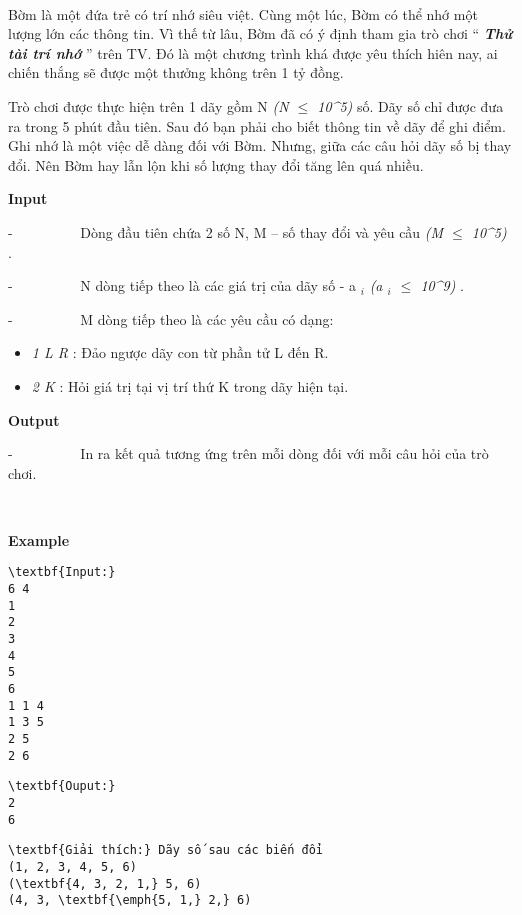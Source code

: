 

 

Bờm là một đứa trẻ có trí nhớ siêu việt. Cùng một lúc, Bờm có thể nhớ một lượng lớn các thông tin. Vì thế từ lâu, Bờm đã có ý định tham gia trò chơi “ \emph{\textbf{ Thử tài trí nhớ }} ” trên TV. Đó là một chương trình khá được yêu thích hiên nay, ai chiến thắng sẽ được một thưởng không trên 1 tỷ đồng.

Trò chơi được thực hiện trên 1 dãy gồm N \emph{ (N $\le$ 10\textasciicircum5) } số. Dãy số chỉ được đưa ra trong 5 phút đầu tiên. Sau đó bạn phải cho biết thông tin về dãy để ghi điểm. Ghi nhớ là một việc dễ dàng đối với Bờm. Nhưng, giữa các câu hỏi dãy số bị thay đổi. Nên Bờm hay lẫn lộn khi số lượng thay đổi tăng lên quá nhiều.

\textbf{Input }

-          Dòng đầu tiên chứa 2 số N, M – số thay đổi và yêu cầu \emph{ (M  $\le$  10\textasciicircum5) } .

-          N dòng tiếp theo là các giá trị của dãy số - a $_ i $\emph{ (a $_ i $  $\le$  10\textasciicircum9) } .

-          M dòng tiếp theo là các yêu cầu có dạng:
\begin{itemize}
	\item \emph{1 L R } : Đảo ngược dãy con từ phần tử L đến R.
	\item \emph{2 K } : Hỏi giá trị tại vị trí thứ K trong dãy hiện tại.
\end{itemize}

\textbf{Output }

-          In ra kết quả tương ứng trên mỗi dòng đối với mỗi câu hỏi của trò chơi.

 

\textbf{Example }
\begin{verbatim}
\textbf{Input:}
6 4
1
2
3
4
5
6
1 1 4
1 3 5
2 5
2 6
\end{verbatim}
\begin{verbatim}
\textbf{Ouput:}
2
6\end{verbatim}
\begin{verbatim}
\textbf{Giải thích:} Dãy số sau các biến đổi
(1, 2, 3, 4, 5, 6)
(\textbf{4, 3, 2, 1,} 5, 6)
(4, 3, \textbf{\emph{5, 1,} 2,} 6)\end{verbatim}
